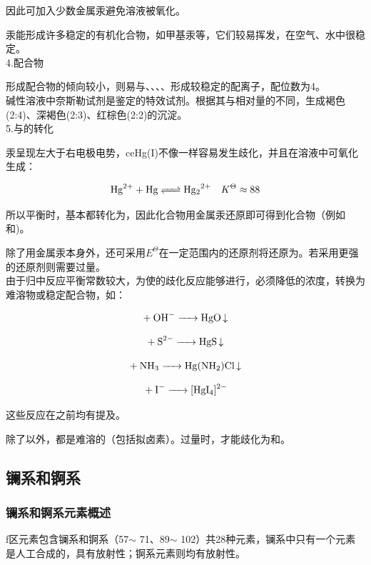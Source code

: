 \documentclass[a4paper,UTF8]{article}
\begin{document}
因此可加入少数金属汞避免溶液被氧化。

汞能形成许多稳定的有机化合物，如甲基汞等，它们较易挥发，在空气、水中很稳定。\\

4.配合物

形成配合物的倾向较小，则易与、、、、形成较稳定的配离子，配位数为4。\\

碱性溶液中奈斯勒试剂是鉴定的特效试剂。根据其与相对量的不同，生成褐色(2:4)、深褐色(2:3)、红棕色(2:2)的沉淀。\\

5.与的转化

汞呈现左大于右电极电势，ce{Hg(I)}不像一样容易发生歧化，并且在溶液中可氧化生成：

$$ \ce{Hg^{2+} + Hg <=> Hg2^{2+}} \quad K^{\Theta} \approx 88$$

所以平衡时，基本都转化为，因此化合物用金属汞还原即可得到化合物（例如和)。

除了用金属汞本身外，还可采用$E^{\Theta}$在一定范围内的还原剂将还原为。若采用更强的还原剂则需要过量。\\

由于归中反应平衡常数较大，为使的歧化反应能够进行，必须降低的浓度，转换为难溶物或稳定配合物，如：

$$ \ce{+ OH- -> HgO v} $$

$$ \ce{+ S^{2-} -> HgS v} $$

$$ \ce{+ NH3 -> Hg(NH2)Cl v} $$

$$ \ce{+ I- -> [HgI4]^{2-}} $$

这些反应在之前均有提及。

除了以外，都是难溶的（包括拟卤素）。过量时，才能歧化为和。

\subsection{镧系和锕系}

\subsubsection{镧系和锕系元素概述}

f区元素包含镧系和锕系（57$\sim$ 71、89$\sim$ 102）共28种元素，镧系中只有一个元素是人工合成的，具有放射性；锕系元素则均有放射性。\\
\end{document}

